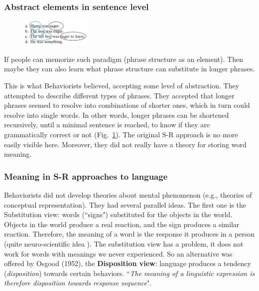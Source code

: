 \subsubsection{Abstract elements in sentence level}

\begin{figure}
  \centering
  \includegraphics[width=0.3\textwidth]{images/elements.png}
  \caption{}
  \label{fig:elements}
\end{figure}
If people can memorize such paradigm (phrase structure as an element). Then maybe they can also learn what phrase structure can substitute in longer phrases.

This is what Behaviorists believed, accepting some level of abstraction. They attempted to describe different types of phrases. They accepted that longer phrases seemed to resolve into combinations of shorter ones, which in turn could resolve into single words. In other words, longer phrases can be shortened recursively, until a minimal sentence is reached, to know if they are grammatically correct or not (Fig.~\ref{fig:elements}).
The original S-R approach is no more easily visible here.
Moreover, they did not really have a theory for storing word meaning.

\subsubsection{Meaning in S-R approaches to language}
Behaviorists did not develop theories about mental phenomenon (e.g., theories of conceptual representation). They had several parallel ideas.
The first one is the {Substitution view}: words (``signs") substituted for the objects in the world. Objects in the world produce a real reaction, and the sign produces a similar reaction.  Therefore, the meaning of a word is the response it produces in a person (quite neuro-scientific idea \notet). The substitution view has a problem, it does not work for words with meanings we never experienced. So an alternative was offered by Osgood (1952), the \textbf{Disposition view}: language produces a tendency (\textit{disposition}) towards certain behaviors. ``\textit{The meaning of a linguistic expression is therefore disposition towards response sequence}".


